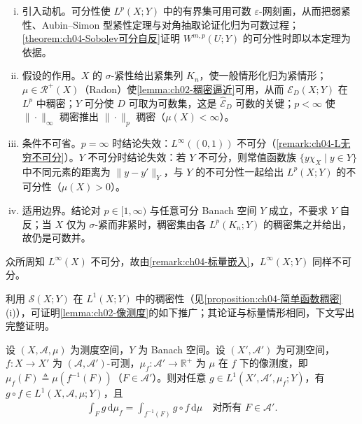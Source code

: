 \documentclass[../../main.tex]{subfiles}%
\begin{document}
\begin{remark}
\begin{enumerate}[(i)]
\item 引入动机。可分性使 $L^p(X;Y)$ 中的有界集可用可数 $\varepsilon$-网刻画，从而把弱紧性、Aubin--Simon 型紧性定理与对角抽取论证化归为可数过程；\cref{theorem:ch04-Sobolev可分自反}证明 $W^{m,p}(U;Y)$ 的可分性时即以本定理为依据。

\item 假设的作用。$X$ 的 $\sigma$-紧性给出紧集列 $K_n$，使一般情形化归为紧情形；$\mu\in\mathscr{R}^+(X)$（Radon）使\cref{lemma:ch02-稠密逼近}可用，从而 $\mathcal{E}_D(X;Y)$ 在 $L^p$ 中稠密；$Y$ 可分使 $D$ 可取为可数集，这是 $\widehat{\mathcal{E}}_D$ 可数的关键；$p<\infty$ 使 $\|\cdot\|_\infty$ 稠密推出 $\|\cdot\|_p$ 稠密（$\mu(X)<\infty$）。

\item 条件不可省。$p=\infty$ 时结论失效：$L^\infty((0,1))$ 不可分（\cref{remark:ch04-L无穷不可分}）。$Y$ 不可分时结论失效：若 $Y$ 不可分，则常值函数族 $\{y\chi_X\mid y\in Y\}$ 中不同元素的距离为 $\|y-y'\|_Y$，与 $Y$ 的不可分性一起给出 $L^p(X;Y)$ 的不可分性（$\mu(X)>0$）。

\item 适用边界。结论对 $p\in[1,\infty)$ 与任意可分 Banach 空间 $Y$ 成立，不要求 $Y$ 自反；当 $X$ 仅为 $\sigma$-紧而非紧时，稠密集由各 $L^p(K_n;Y)$ 的稠密集之并给出，故仍是可数并。
\end{enumerate}
\end{remark}

\begin{remark}\label{remark:ch04-L无穷不可分}
众所周知 $L^\infty(X)$ 不可分，故由\cref{remark:ch04-标量嵌入}，$L^\infty(X;Y)$ 同样不可分。
\end{remark}

利用 $\mathcal{S}(X;Y)$ 在 $L^1(X;Y)$ 中的稠密性（见\cref{proposition:ch04-简单函数稠密}(i)），可证明\cref{lemma:ch02-像测度}的如下推广；其论证与标量情形相同，下文写出完整证明。

\begin{proposition}[变量替换公式]\label{proposition:ch04-像测度积分}
设 $(X,\mathcal{A},\mu)$ 为测度空间，$Y$ 为 Banach 空间。设 $(X',\mathcal{A}')$ 为可测空间，$f:X\to X'$ 为 $(\mathcal{A},\mathcal{A}')$-可测，$\mu_f:\mathcal{A}'\to\mathbb{R}^+$ 为 $\mu$ 在 $f$ 下的像测度，即 $\mu_f(F)\triangleq\mu(f^{-1}(F))$（$F\in\mathcal{A}'$）。则对任意 $g\in L^1(X',\mathcal{A}',\mu_f;Y)$，有 $g\circ f\in L^1(X,\mathcal{A},\mu;Y)$，且
\begin{align}
\int_F g\,\mathrm{d}\mu_f=\int_{f^{-1}(F)}g\circ f\,\mathrm{d}\mu\quad\text{对所有 }F\in\mathcal{A}'. \label{align:ch04-4.72}
\end{align}
\end{proposition}
\end{document}
